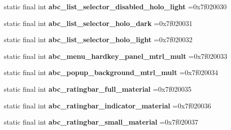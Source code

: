 \begin{DoxyCompactItemize}
\item 
\mbox{\label{classproject4_1_1xaria_1_1R_1_1drawable_a5af4e935451dfe30237d417a83ed9e67}} 
static final int {\bfseries abc\+\_\+list\+\_\+selector\+\_\+disabled\+\_\+holo\+\_\+light} =0x7f020030
\item 
\mbox{\label{classproject4_1_1xaria_1_1R_1_1drawable_aff553aa5cb6f3194f66a045218a99fdd}} 
static final int {\bfseries abc\+\_\+list\+\_\+selector\+\_\+holo\+\_\+dark} =0x7f020031
\item 
\mbox{\label{classproject4_1_1xaria_1_1R_1_1drawable_af26bcf5bfb3b5eaf2836fc132a38d241}} 
static final int {\bfseries abc\+\_\+list\+\_\+selector\+\_\+holo\+\_\+light} =0x7f020032
\item 
\mbox{\label{classproject4_1_1xaria_1_1R_1_1drawable_a5c9b1a8bde234eee1346214e11ca9b6e}} 
static final int {\bfseries abc\+\_\+menu\+\_\+hardkey\+\_\+panel\+\_\+mtrl\+\_\+mult} =0x7f020033
\item 
\mbox{\label{classproject4_1_1xaria_1_1R_1_1drawable_abfec87b418b127234800a5109121647c}} 
static final int {\bfseries abc\+\_\+popup\+\_\+background\+\_\+mtrl\+\_\+mult} =0x7f020034
\item 
\mbox{\label{classproject4_1_1xaria_1_1R_1_1drawable_a0c4ca8232b6bb8a4c28f4029d90319ac}} 
static final int {\bfseries abc\+\_\+ratingbar\+\_\+full\+\_\+material} =0x7f020035
\item 
\mbox{\label{classproject4_1_1xaria_1_1R_1_1drawable_a8207383b2e24042d1f9455745003d7c8}} 
static final int {\bfseries abc\+\_\+ratingbar\+\_\+indicator\+\_\+material} =0x7f020036
\item 
\mbox{\label{classproject4_1_1xaria_1_1R_1_1drawable_a05f7d726174b89a0ea5ade7777a981b4}} 
static final int {\bfseries abc\+\_\+ratingbar\+\_\+small\+\_\+material} =0x7f020037
\item 
\mbox{\label{classproject4_1_1xaria_1_1R_1_1drawable_a44dde6e654052d247ba8a55ca2af7a21}} 

\end{DoxyCompactItemize}
